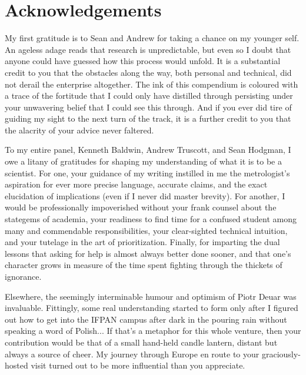 \section*{Acknowledgements}

My first gratitude is to Sean and Andrew for taking a chance on my younger self. 
An ageless adage reads that research is unpredictable, but even so I doubt that anyone could have guessed how this process would unfold.
It is a substantial credit to you that the obstacles along the way, both personal and technical, did not derail the enterprise altogether.
The ink of this compendium is coloured with a trace of the fortitude that I could only have distilled through persisting under your unwavering belief that I could see this through.
And if you ever did tire of guiding my sight to the next turn of the track, it is a further credit to you that the alacrity of your advice never faltered.

To my entire panel, Kenneth Baldwin, Andrew Truscott, and Sean Hodgman, I owe a litany of gratitudes for shaping my understanding of what it is to be a scientist.
For one, your guidance of my writing instilled in me the metrologist's aspiration for ever more precise language, accurate claims, and the exact elucidation of implications (even if I never did master brevity).
For another, I would be professionally impoverished without your frank counsel about the stategems of academia, your readiness to find time for a confused student among many and commendable responsibilities, your clear-sighted technical intuition, and your tutelage in the art of prioritization.
Finally, for imparting the dual lessons that asking for help is almost always better done sooner, and that one's character grows in measure of the time spent fighting through the thickets of ignorance.

Elsewhere, the seemingly interminable humour and optimism of Piotr Deuar was invaluable.
Fittingly, some real understanding started to form only after I figured out how to get into the IFPAN campus after dark in the pouring rain without speaking a word of Polish... 
If that's a metaphor for this whole venture, then your contribution would be that of a small hand-held candle lantern, distant but always a source of cheer.
My journey through Europe en route to your graciously-hosted visit turned out to be more influential than you appreciate. 

